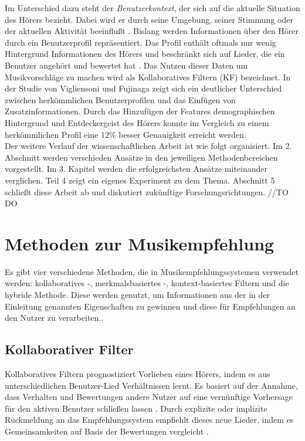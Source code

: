 \documentclass[twosided,a4,10pt]{article}
\begin{document}
\begin{multicols}{2}
		Im Unterschied dazu steht der \textit{Benutzerkontext}, der sich auf die aktuelle Situation des Hörers bezieht. Dabei wird er durch seine Umgebung, seiner Stimmung oder der aktuellen Aktivität beeinflußt \cite{knees}.\newline
		Bislang werden Informationen über den Hörer durch ein Benutzerprofil repräsentiert. Das Profil enthält oftmals nur wenig Hintergrund Informationen des Hörers und beschränkt sich auf Lieder, die ein Benutzer angehört und bewertet hat \cite{oord}. Das Nutzen dieser Daten um Musikvorschläge zu machen wird als Kollaboratives Filtern (KF) bezeichnet. In der Studie von Vigliensoni und Fujinaga \cite{vigliensoni} zeigt sich ein deutlicher Unterschied zwischen herkömmlichen Benutzerprofilen und das Einfügen von Zusatzinformationen. Durch das Hinzufügen der Features demographischen Hintergrund und Entdeckergeist des Hörers konnte im Vergleich zu einem herkömmlichen Profil eine 12\% besser Genauigkeit erreicht werden.\newline\\
		Der weitere Verlauf der wissenschaftlichen Arbeit ist wie folgt organisiert. Im 2. Abschnitt werden verschieden Ansätze in den jeweiligen Methodenbereichen vorgestellt. Im 3. Kapitel werden die erfolgreichsten Ansätze miteinander verglichen. Teil 4 zeigt ein eigenes Experiment zu dem Thema. Abschnitt 5 schließt diese Arbeit ab und diskutiert zukünftige Forschungsrichtungen. //TO DO
		
		\section{Methoden zur Musikempfehlung}
		Es gibt vier verschiedene Methoden, die in Musikempfehlungssystemen verwendet werden: kollaboratives -, merkmalsbasiertes -, kontext-basiertes Filtern und die hybride Methode. Diese werden genutzt, um Informationen aus der in der Einleitung genannten Eigenschaften zu gewinnen und diese für Empfehlungen an den Nutzer zu verarbeiten.\cite{kaitila}.
		
	
		\subsection{Kollaborativer Filter}
		Kollaboratives Filtern prognostiziert Vorlieben eines Hörers, indem es aus unterschiedlichen Benutzer-Lied Verhältnissen lernt. Es basiert auf der Annahme, dass Verhalten und Bewertungen andere Nutzer auf eine vernünftige Vorhersage für den aktiven Benutzer schließen lassen \cite{celma}. Durch explizite oder implizite Rückmeldung an das Empfehlungssystem empfiehlt dieses neue Lieder, indem es Gemeinsamkeiten auf Basis der Bewertungen vergleicht \cite{mcfee}.\newline
		

\end{multicols}
\end{document}

